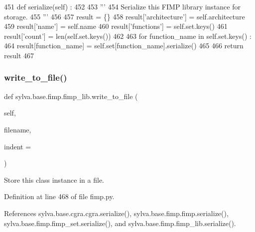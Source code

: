 \begin{DoxyCode}
451     \textcolor{keyword}{def }serialize(self) :
452 
453       \textcolor{stringliteral}{'''}
454 \textcolor{stringliteral}{        Serialize this FIMP library instance for storage.}
455 \textcolor{stringliteral}{      '''}
456 
457       result = \{\}
458       result[\textcolor{stringliteral}{'architecture'}] = self.architecture
459       result[\textcolor{stringliteral}{'name'}] = self.name
460       result[\textcolor{stringliteral}{'functions'}] = self.set.keys()
461       result[\textcolor{stringliteral}{'count'}] = len(self.set.keys())
462 
463       \textcolor{keywordflow}{for} function\_name \textcolor{keywordflow}{in} self.set.keys() :
464         result[function\_name] = self.set[function\_name].serialize()
465 
466       \textcolor{keywordflow}{return} result
467 
\end{DoxyCode}
\mbox{\label{classsylva_1_1base_1_1fimp_1_1fimp__lib_af91977d4298ea61721adb4a0d04c5b16}} 
\subsubsection{\texorpdfstring{write\+\_\+to\+\_\+file()}{write\_to\_file()}}
{\footnotesize\ttfamily def sylva.\+base.\+fimp.\+fimp\+\_\+lib.\+write\+\_\+to\+\_\+file (\begin{DoxyParamCaption}\item[{}]{self,  }\item[{}]{filename,  }\item[{}]{indent = {} }\end{DoxyParamCaption})}

\begin{DoxyVerb}  Store this class instance in a file.
\end{DoxyVerb}
 

Definition at line 468 of file fimp.\+py.



References sylva.\+base.\+cgra.\+cgra.\+serialize(), sylva.\+base.\+fimp.\+fimp.\+serialize(), sylva.\+base.\+fimp.\+fimp\+\_\+set.\+serialize(), and sylva.\+base.\+fimp.\+fimp\+\_\+lib.\+serialize().



